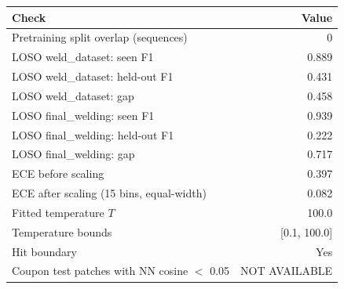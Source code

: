 \begin{tabular}{@{}lr@{}}
\toprule
Check & Value \\
\midrule
Pretraining split overlap (sequences) & 0 \\
LOSO weld_dataset: seen F1 & 0.889 \\
LOSO weld_dataset: held-out F1 & 0.431 \\
LOSO weld_dataset: gap & 0.458 \\
LOSO final_welding: seen F1 & 0.939 \\
LOSO final_welding: held-out F1 & 0.222 \\
LOSO final_welding: gap & 0.717 \\
ECE before scaling & 0.397 \\
ECE after scaling (15 bins, equal-width) & 0.082 \\
Fitted temperature $T$ & 100.0 \\
Temperature bounds & [0.1, 100.0] \\
Hit boundary & Yes \\
Coupon test patches with NN cosine $<$ 0.05 & NOT AVAILABLE \\
\bottomrule
\end{tabular}
